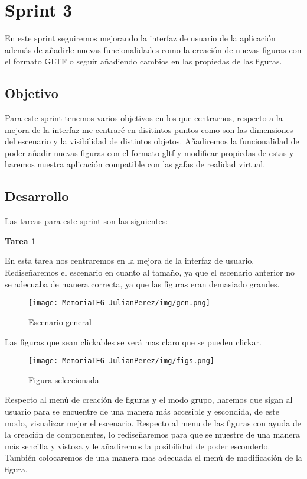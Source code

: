 \documentclass[a4paper, 12pt]{book}
\begin{document}
\section{Sprint 3}

En este sprint seguiremos mejorando la interfaz de usuario de la aplicación además de añadirle nuevas funcionalidades como la creación de nuevas figuras con el formato GLTF o seguir añadiendo cambios en las propiedas de las figuras.

\subsection{Objetivo}
Para este sprint tenemos varios objetivos en los que centrarnos, respecto a la mejora de la interfaz me centraré en disitintos puntos como son las dimensiones del escenario y la visibilidad de distintos objetos. Añadiremos la funcionalidad de poder añadir nuevas figuras con el formato gltf y modificar propiedas de estas y haremos nuestra aplicación compatible con las gafas de realidad virtual.

\subsection{Desarrollo}
Las tareas para este sprint son las siguientes:

\textbf{Tarea 1}

En esta tarea nos centraremos en la mejora de la interfaz de usuario. Rediseñaremos el escenario en cuanto al tamaño, ya que el escenario anterior no se adecuaba de manera correcta, ya que las figuras eran demasiado grandes. 

\begin{figure}[H]
  \centering
  \texttt{[image: MemoriaTFG-JulianPerez/img/gen.png]}
  \caption{Escenario general}\label{gen}
\end{figure}

Las figuras que sean clickables se verá mas claro que se pueden clickar.
\begin{figure}[H]
  \centering
  \texttt{[image: MemoriaTFG-JulianPerez/img/figs.png]}
  \caption{Figura seleccionada}\label{scrum}
\end{figure}

Respecto al menú de creación de figuras y el modo grupo, haremos que sigan al usuario para se encuentre de una manera más accesible y escondida, de este modo, visualizar mejor el escenario. Respecto al menu de las figuras con ayuda de la creación de componentes, lo rediseñaremos para que se muestre de una manera más sencilla y vistosa y le añadiremos la posibilidad de poder esconderlo. También colocaremos de una manera mas adecuada el menú de modificación de la figura. 
\end{document}
